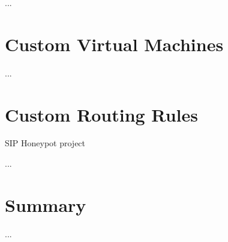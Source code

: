 ...


\section{Custom Virtual Machines}
\label{sec:Custom-Virtual-Machines}

...


\section{Custom Routing Rules}
\label{sec:Custom-Routing-Rules}

SIP Honeypot project~\cite{IFIPNetworking2014}

...



\section{Summary}

...
